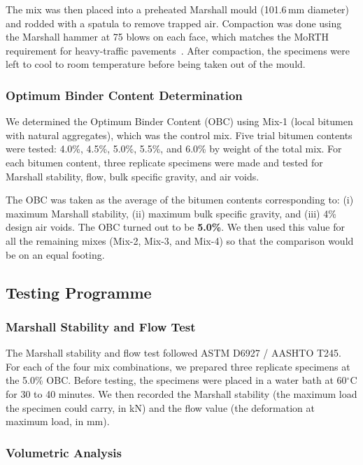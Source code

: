 \documentclass[12pt,a4paper]{article}
\begin{document}
The mix was then placed into a preheated Marshall mould (101.6\,mm diameter) and rodded with a spatula to remove trapped air. Compaction was done using the Marshall hammer at 75 blows on each face, which matches the MoRTH requirement for heavy-traffic pavements~\cite{rajkumar2018experimental}. After compaction, the specimens were left to cool to room temperature before being taken out of the mould.

\subsubsection{Optimum Binder Content Determination}

We determined the Optimum Binder Content (OBC) using Mix-1 (local bitumen with natural aggregates), which was the control mix. Five trial bitumen contents were tested: 4.0\%, 4.5\%, 5.0\%, 5.5\%, and 6.0\% by weight of the total mix. For each bitumen content, three replicate specimens were made and tested for Marshall stability, flow, bulk specific gravity, and air voids.

The OBC was taken as the average of the bitumen contents corresponding to: (i) maximum Marshall stability, (ii) maximum bulk specific gravity, and (iii) 4\% design air voids. The OBC turned out to be \textbf{5.0\%}. We then used this value for all the remaining mixes (Mix-2, Mix-3, and Mix-4) so that the comparison would be on an equal footing.

\subsection{Testing Programme}

\subsubsection{Marshall Stability and Flow Test}

The Marshall stability and flow test followed ASTM D6927 / AASHTO T245. For each of the four mix combinations, we prepared three replicate specimens at the 5.0\% OBC. Before testing, the specimens were placed in a water bath at 60$^{\circ}$C for 30 to 40 minutes. We then recorded the Marshall stability (the maximum load the specimen could carry, in kN) and the flow value (the deformation at maximum load, in mm).

\subsubsection{Volumetric Analysis}
\end{document}
